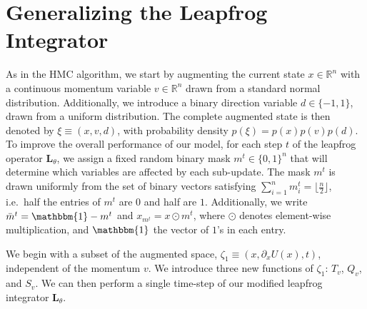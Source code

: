 %
\section{Generalizing the Leapfrog Integrator}%
\label{sec:generalizing_lf}
As in the HMC algorithm, we start by augmenting the current state $x \in
\mathbb{R}^n$ with a continuous momentum variable $v \in \mathbb{R}^{n}$ drawn
from a standard normal distribution.
%
Additionally, we introduce a binary direction variable $d \in \{ -1, 1\}$,
drawn from a uniform distribution. 
%
The complete augmented state is then denoted by $\xi \equiv (x, v, d)$, with
probability density $p(\xi) = p(x) p(v) p(d)$.
%
To improve the overall performance of our model, for each step $t$ of the
leapfrog operator $\mathbf{L}_{\theta}$, we assign a fixed random binary mask
$m^{t} \in{\{0, 1\}}^n$ that will determine which variables are affected by
each sub-update.
%
The mask $m^t$ is drawn uniformly from the set of binary vectors satisfying
$\sum_{i=1}^{n} m_{i}^{t} = \lfloor \frac{n}{2}\rfloor$, i.e.\ half the entries
of $m^t$ are $0$ and half are $1$.
%
Additionally, we write $\bar m^{t} = \mathbbm{1} - m^{t}$ and $x_{m^t} = x
\odot m^{t}$, where $\odot$ denotes element-wise multiplication, and
$\mathbbm{1}$ the vector of $1$'s in each entry.
%

We begin with a subset of the augmented space, $\zeta_1 \equiv (x, \partial_{x}
U(x), t)$, independent of the momentum $v$.
%
We introduce three new functions of $\zeta_1$: $T_v$, $Q_v$, and $S_v$.
%
We can then perform a single time-step of our modified leapfrog integrator
$\mathbf{L}_{\theta}$.
%

